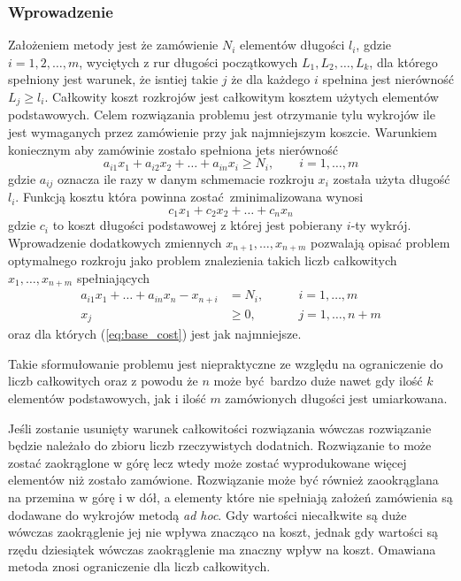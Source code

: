 \subsubsection{Wprowadzenie}
Założeniem metody jest że zamówienie $N_i$ elementów długości $l_i$, gdzie $i=1,2,\dots,m$, wyciętych z rur długości początkowych $L_1, L_2, \dots, L_k$, dla którego spełniony jest warunek, że isntiej takie $j$ że dla każdego $i$ spełnina jest nierówność $L_j \ge l_i$. Całkowity koszt rozkrojów jest całkowitym kosztem użytych elementów podstawowych. Celem rozwiązania problemu jest otrzymanie tylu wykrojów ile jest wymaganych przez zamówienie przy jak najmniejszym koszcie. Warunkiem koniecznym aby zamówinie zostało spełniona jets nierówność
\begin{equation*}
a_{i1}x_1 + a_{i2}x_2 + \dots + a_{in}x_i \ge N_i, \qquad i = 1, \dots, m
\end{equation*}
gdzie $a_{ij}$ oznacza ile razy w danym schmemacie rozkroju $x_i$ została użyta długość $l_i$. Funkcją kosztu która powinna zostać zminimalizowana wynosi
\begin{equation}\label{eq:base_cost}
  c_1x_1 + c_2x_2+\dots+c_nx_n
\end{equation}
gdzie  $c_i$ to koszt długości podstawowej z której jest pobierany $i$-ty wykrój. Wprowadzenie dodatkowych zmiennych $x_{n+1},\dots,x_{n+m}$ pozwalają opisać problem optymalnego rozkroju jako problem znalezienia takich liczb całkowitych $x_1,\dots,x_{n+m}$ spełniających
\begin{align}
    a_{i1}x_1+\dots+a_{in}x_n-x_{n+i} & =N_i, & \qquad i=1,\dots,m  \label{eq:additional_base}\\
    x_j & \ge 0, & \qquad j=1,\dots,n+m \label{eq:additional_base_condition}
\end{align}
oraz dla których (\ref{eq:base_cost}) jest jak najmniejsze.

Takie sformułowanie problemu jest niepraktyczne ze względu na ograniczenie do liczb całkowitych oraz z powodu że $n$ może być bardzo duże nawet gdy ilość $k$ elementów podstawowych, jak i ilość $m$ zamówionych długości jest umiarkowana.

Jeśli zostanie usunięty warunek całkowitości rozwiązania wówczas rozwiązanie będzie należało do zbioru liczb rzeczywistych dodatnich. Rozwiązanie to może zostać zaokrąglone w górę lecz wtedy może zostać wyprodukowane więcej elementów niż zostało zamówione. Rozwiązanie może być również zaookrąglana na przemina w górę i w dół, a elementy które nie spełniają założeń zamówienia są dodawane do wykrojów metodą \textit{ad hoc}. Gdy wartości niecałkwite są duże wówczas zaokrąglenie jej nie wpływa znacząco na koszt, jednak gdy wartości są rzędu dziesiątek wówczas zaokrąglenie ma znaczny wpływ na koszt. Omawiana metoda znosi ograniczenie dla liczb całkowitych.

